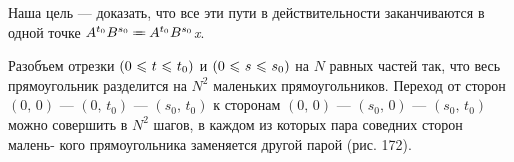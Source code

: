 \documentclass[9pt,a5paper]{article}
\renewcommand{\leq}{\leqslant}
\newcommand\hs[1]{\hspace{#1}}
\newcommand\vs[1]{\vspace{#1}}
\newcommand\eq{\hs{-.6pt}=\joinrel\hs{-4pt}=\hs{-.6pt}}
\begin{document}
\hs{.5pt} Наша цель --- доказать, что все эти пути в действительности заканчиваются \newline
в одной точке $A^{t_0}B^{s_0} \eq A^{t_0}B^{s_0}$\textit{x}.

\hs{.5pt} Разобъем отрезки $(0 \hs{.5pt}\leq\hs{.5pt} t \hs{.5pt}\leq\hs{.5pt} t_0)$ и $(0 \hs{.5pt}\leq\hs{.5pt} s \hs{.5pt}\leq\hs{.5pt} s_0)$ на \hs{1pt} $N$ равных частей так, \hs{1pt} что \vs{-1pt}\newline
весь \hs{1pt} прямоугольник \hs{1pt} разделится на $N^2$ \hs{.5pt} маленьких прямоугольников. Переход \vs{-1pt}\newline
от \hs{1pt} сторон $(0, \hs{2pt} 0)$ --- $(0, \hs{2pt} t_0)$ --- $(s_0, \hs{2pt} t_0)$ к сторонам $(0, \hs{2pt} 0)$ --- $(s_0, \hs{2pt} 0)$ --- $(s_0, \hs{2pt} t_0)$ можно \vs{-1pt}\newline
совершить \hs{.5pt} в \hs{1pt} $N^2$ шагов, \hs{1pt} в каждом из которых \hs{1pt} пара соведних сторон малень- \vs{-1pt}\newline
кого прямоугольника \hs{1pt} заменяется другой парой \hs{1pt} (рис. 172).
\end{document}
